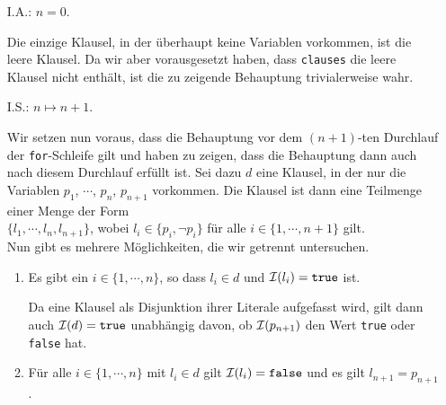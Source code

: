 \begin{enumerate}
\item[I.A.:] $n = 0$.

             Die einzige Klausel, in der \"{u}berhaupt keine Variablen vorkommen, ist die leere Klausel.
             Da wir aber vorausgesetzt haben, dass \texttt{clauses} die leere Klausel nicht enth\"{a}lt,
             ist die zu zeigende Behauptung trivialerweise wahr.
\item[I.S.:] $n \mapsto n+1$.

             Wir setzen nun voraus, dass die Behauptung vor dem $(n\!+\!1)$-ten Durchlauf der
             \texttt{for}-Schleife gilt und haben zu zeigen, dass die Behauptung dann auch nach
             diesem Durchlauf erf\"{u}llt ist.  Sei dazu $d$ eine Klausel, in der nur die Variablen
             $p_1$, $\cdots$, $p_n$, $p_{n+1}$ vorkommen.  Die Klausel ist dann eine Teilmenge einer
             Menge der Form
             \\[0.2cm]
             \hspace*{1.3cm}
             $\{ l_1, \cdots, l_n, l_{n+1} \}$, \quad wobei $l_i \in \{ p_i, \neg p_i \}$ f\"{u}r alle
             $i \in \{1,\cdots, n+1\}$ gilt.
             \\[0.2cm]
             Nun gibt es mehrere M\"{o}glichkeiten, die wir getrennt untersuchen.
             \begin{enumerate}
             \item Es gibt ein $i \in \{1,\cdots,n\}$, so dass $l_i \in d$ und  $\mathcal{I}(l_i) =
               \mathtt{true}$ ist.  

                   Da eine Klausel als Disjunktion ihrer Literale aufgefasst wird, gilt dann auch
                   $\mathcal{I}(d) = \mathtt{true}$ unabh\"{a}ngig davon, ob $\mathcal{I}(p_{n+1})$ den Wert \texttt{true} oder
                   \texttt{false} hat.
             \item F\"{u}r alle $i \in \{1,\cdots,n\}$ mit $l_i \in d$ gilt $\mathcal{I}(l_i) = \mathtt{false}$ und es gilt $l_{n+1} = p_{n+1}$.
                   

\end{enumerate}
\end{enumerate}
